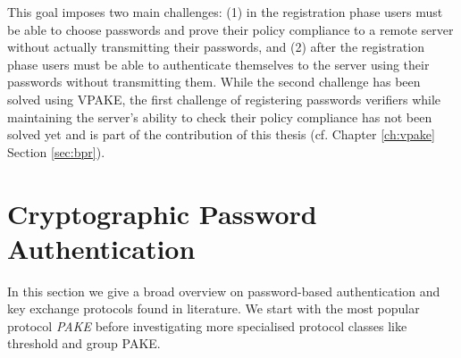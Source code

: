 This goal imposes two main challenges:
(1) in the registration phase users must be able to choose passwords and prove their policy compliance to a remote server without actually transmitting their passwords, and 
(2) after the registration phase users must be able to authenticate themselves to the server using their passwords without transmitting them.
While the second challenge has been solved using \ac{VPAKE}, the first challenge of registering passwords verifiers while maintaining the server's ability to check their policy compliance has not been solved yet and is part of the contribution of this thesis (cf. Chapter \ref{ch:vpake} Section \ref{sec:bpr}).



\section{Cryptographic Password Authentication}\label{sec:intro:pake}
In this section we give a broad overview on password-based authentication and key exchange protocols found in literature.
We start with the most popular protocol \emph{\ac{PAKE}} before investigating more specialised protocol classes like threshold and group \ac{PAKE}.

